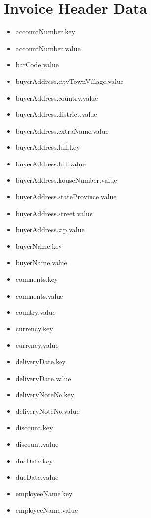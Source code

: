 \begin{table}[!ht]
    
  
    \end{table}


\cleardoublepage


\section{Invoice Header Data}
\begin{multicols}{2}
	\label{invoice-header}
	\begin{itemize}
		\setlength\multicolsep{0pt}
\item[] accountNumber.key
\item[] accountNumber.value
\item[] barCode.value
\item[] buyerAddress.cityTownVillage.value
\item[] buyerAddress.country.value
\item[] buyerAddress.district.value
\item[] buyerAddress.extraName.value
\item[] buyerAddress.full.key
\item[] buyerAddress.full.value
\item[] buyerAddress.houseNumber.value
\item[] buyerAddress.stateProvince.value
\item[] buyerAddress.street.value
\item[] buyerAddress.zip.value
\item[] buyerName.key
\item[] buyerName.value
\item[] comments.key
\item[] comments.value
\item[] country.value
\item[] currency.key
\item[] currency.value
\item[] deliveryDate.key
\item[] deliveryDate.value
\item[] deliveryNoteNo.key
\item[] deliveryNoteNo.value
\item[] discount.key
\item[] discount.value
\item[] dueDate.key
\item[] dueDate.value
\item[] employeeName.key
\item[] employeeName.value

\end{itemize}
\end{multicols}
